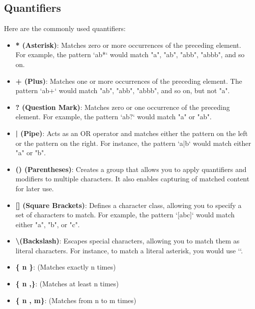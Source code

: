 \documentclass{report}
\begin{document}
    \subsection{Quantifiers}
    Here are the commonly used quantifiers:
    \begin{itemize}
        \item \textbf{* (Asterisk)}: Matches zero or more occurrences of the preceding element. For example, the pattern `ab*` would match "a", "ab", "abb", "abbb", and so on.
        \item \textbf{+ (Plus)}: Matches one or more occurrences of the preceding element. The pattern `ab+` would match "ab", "abb", "abbb", and so on, but not "a".
        \item \textbf{? (Question Mark)}: Matches zero or one occurrence of the preceding element. For example, the pattern `ab$?$` would match "a" or "ab".
        \item \textbf{| (Pipe)}: Acts as an OR operator and matches either the pattern on the left or the pattern on the right. For instance, the pattern `a|b` would match either "a" or "b".
        \item \textbf{() (Parentheses)}: Creates a group that allows you to apply quantifiers and modifiers to multiple characters. It also enables capturing of matched content for later use.
        \item \textbf{[] (Square Brackets)}: Defines a character class, allowing you to specify a set of characters to match. For example, the pattern `[abc]` would match either "a", "b", or "c".
        \item \textbf{\textbackslash (Backslash)}: Escapes special characters, allowing you to match them as literal characters. For instance, to match a literal asterisk, you would use `\*`.
        \item \textbf{\{ n \}}: (Matches exactly n times)
        \item \textbf{\{ n ,\}}: (Matches at least n times)
        \item \textbf{\{ n , m\}}: (Matches from n to m times)
    \end{itemize}

    \pagebreak \bigbreak \noindent
\end{document}
